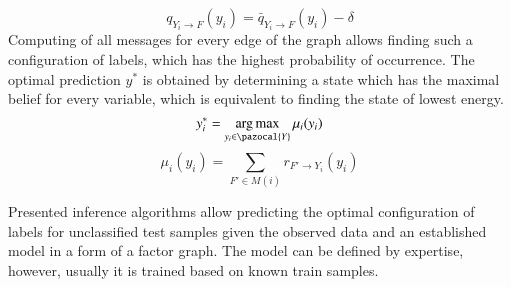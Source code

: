 \begin{equation}
    q_{Y_i\rightarrow F}(y_i) = \bar{q}_{Y_i\rightarrow F}(y_i) - \delta
\end{equation}
Computing of all messages for every edge of the graph allows finding such a configuration of labels, which has the highest probability of occurrence. The optimal prediction $y^*$ is obtained by determining a state which has the maximal belief for every variable, which is equivalent to finding the state of lowest energy.
\begin{equation}
   y_{i}^{*} = \argmax_{y_i \in \pazocal{Y}}{\mu_i (y_i)}
\end{equation}
\begin{equation}
   \mu_i (y_i) = \sum_{F' \in M(i)}{ r_{F' \rightarrow Y_i}(y_i)}
\end{equation}

Presented inference algorithms allow predicting the optimal configuration of labels for unclassified test samples given the observed data and an established model in a form of a factor graph. The model can be defined by expertise, however, usually it is trained based on known train samples.